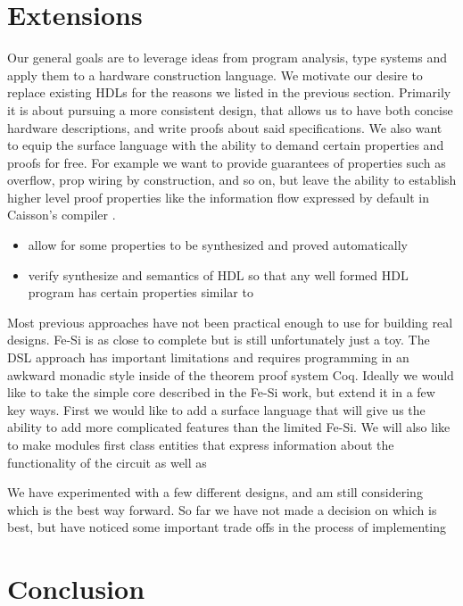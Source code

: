 \documentclass[12pt, titlepage]{article}
\begin{document}
\section{Extensions}

Our general goals are to leverage ideas from program analysis, type systems and
apply them to a hardware construction language. We motivate our desire to replace existing HDLs for the
reasons we listed in the previous section. Primarily it is about pursuing a more consistent design, that
allows us to have both concise hardware descriptions, and write proofs about said specifications. We
also want to equip the surface language with the ability to demand certain properties and proofs for
free. For example we want to provide guarantees of properties such as overflow, prop wiring by construction,
and so on, but leave the ability to establish higher level proof properties like the information
flow expressed by default in Caisson's compiler \cite{Li:2011:CHD:1993498.1993512}.

\begin{itemize}
    \item allow for some properties to be synthesized and proved automatically
    \item verify synthesize and semantics of HDL so that any well formed HDL program has certain properties similar to \cite{Ricketts:2014}
\end{itemize}

Most previous approaches have not been practical enough to use for building real designs. Fe-Si is as close to
complete but is still unfortunately just a toy. The DSL approach has important limitations and requires
programming in an awkward monadic style inside of the theorem proof system Coq. Ideally we would like to take the 
simple core described in the Fe-Si work, but extend it in a few key ways. First we would like to add a surface language
that will give us the ability to add more complicated features than the limited Fe-Si. We will also like to make modules first class
entities that express information about the functionality of the circuit as well as 

We have experimented with a few different designs, and am still considering which is the best way forward.
So far we have not made a decision on which is best, but have noticed some important trade offs in the process
of implementing 

\section{Conclusion}
\end{document}
